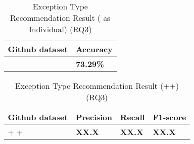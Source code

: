 \begin{table}[t]%
  \caption{Exception Type Recommendation Result ({\xtype} as Individual) (RQ3)}
  \vspace{-12pt}
  \small
	\begin{center}
		\renewcommand{\arraystretch}{1}
		\begin{tabular}{| p{3.05cm}<{\centering} | p{1.2cm}<{\centering}|}
		  \hline
			Github dataset  & Accuracy \\
			\hline
			\xtype   & \textbf{73.29\%} \\
			\hline
		\end{tabular}
		\label{tab:xtype-3}
	\end{center}
\end{table}

\begin{table}[t]%
  \caption{Exception Type Recommendation Result (\xblock+\xstate+\xtype) (RQ3)}
  \vspace{-12pt}
  \small
	\begin{center}
		\renewcommand{\arraystretch}{1}
		\begin{tabular}{| p{3.10cm}<{\centering} | p{1.2cm}<{\centering} | p{1.2cm}<{\centering}| p{1.2cm}<{\centering}|}
		  \hline
			Github dataset  & Precision  & Recall & F1-score \\
			\hline
			\xblock + \xstate  + \xtype  & \textbf{XX.X}  &  \textbf{XX.X} & \textbf{XX.X}\\
			\hline
		\end{tabular}
		\label{tab:xtype-4}
	\end{center}

\end{table}